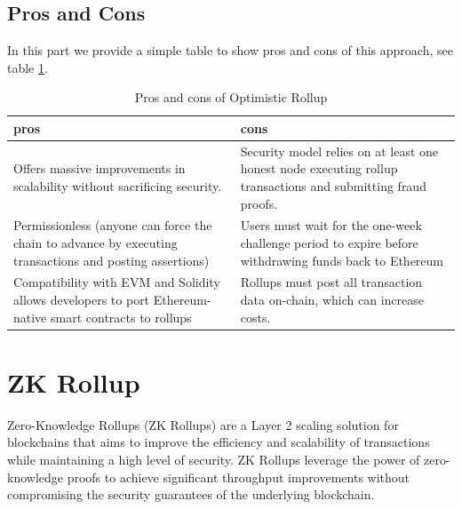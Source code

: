 \subsection{Pros and Cons}
In this part we provide a simple table to show pros and cons of this approach, see table \ref{table:L14_t1}.
\begin{table}[htbp]
	\centering
	\captionsetup{justification=centering}
	\caption[position=above]{Pros and cons of Optimistic Rollup}
	\begin{tabular}{|>{\centering\arraybackslash}p{8cm}|>{\centering\arraybackslash}p{8cm}|}
		\hline
		\textbf{pros} & \textbf{cons}\\
		\hline
		Offers massive improvements in scalability without sacrificing security.
		& Security model relies on at least one honest node executing rollup transactions and submitting fraud proofs.\\
		\hline
		Permissionless (anyone can force the chain to advance by executing transactions and posting assertions) & Users must wait for the one-week challenge period to expire before withdrawing funds back to Ethereum \\
		\hline
		Compatibility with EVM and Solidity allows developers to port Ethereum-native smart contracts to rollups & Rollups must post all transaction data on-chain, which can increase costs. \\
		\hline
	\end{tabular}
	\label{table:L14_t1}
\end{table}
\section{ZK Rollup}
Zero-Knowledge Rollups (ZK Rollups) are a Layer 2 scaling solution for blockchains that aims to improve the efficiency and scalability of transactions while maintaining a high level of security. ZK Rollups leverage the power of zero-knowledge proofs to achieve significant throughput improvements without compromising the security guarantees of the underlying blockchain.
